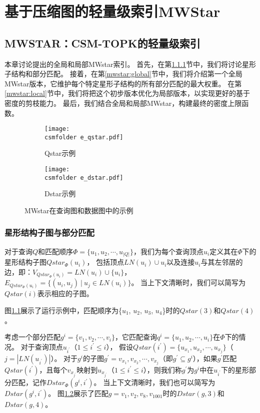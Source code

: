 \chapter{基于压缩图的轻量级索引MWStar}
\label{ch4}
\section{MWSTAR：CSM-TOPK的轻量级索引}
本章讨论提出的全局和局部MWstar索引。
首先，在第\ref{mwstar:star_subquery}节中，我们将讨论星形子结构和部分匹配。
接着，在第\ref{mwstar:global}节中，我们将介绍第一个全局MWstar版本，它维护每个特定星形子结构的所有部分匹配的最大权重。
在第\ref{mwstar:local}节中，我们将把这个初步版本优化为局部版本，以实现更好的基于密度的剪枝能力。
最后，我们结合全局和局部MWstar，构建最终的密度上限函数。

\begin{figure}[h!]
\def\wscorevone{0.48}
\centering
\begin{subfigure}[t]{\wscorevone\linewidth}
\centering
\resizebox{\linewidth}{!}
{
\texttt{[image: \\csmfolder e\_qstar.pdf]}
}
\caption{Qstar示例}
\label{fig:qstar}
\end{subfigure}
\begin{subfigure}[t]{\wscorevone\linewidth}
\centering
\resizebox{\linewidth}{!}
{
\texttt{[image: \\csmfolder e\_dstar.pdf]}
}
\caption{Dstar示例}
\label{fig:dstar}
\end{subfigure}
\caption{MWstar在查询图和数据图中的示例}
\label{fig:exp:mwstar}
\end{figure}

\subsection{星形结构子图与部分匹配}
\label{mwstar:star_subquery}

\begin{definition}[星形结构子图]\label{def:star-subquery}
对于查询$Q$和匹配顺序$\Phi=\{u_1, u_2, \cdots, u_{|Q|} \}$，我们为每个查询顶点$u_i$定义其在$\Phi$下的星形结构子图$Qstar_{\Phi}(u_i)$，
包括顶点$LN(u_i) \cup {u_i}$以及连接$u_i$与其左邻居的边，即：$V_{Qstar_{\Phi}(u_i)} = LN(u_i) \cup \{u_i\}$，$E_{Qstar_{\Phi}(u_i)} = \{(u_i, u_j)\ |\ u_j\in LN(u_i)\}$。
当上下文清晰时，我们可以简写为$Qstar(i)$表示相应的子图。
\end{definition}

图\ref{fig:qstar}展示了运行示例中，匹配顺序为\{$u_1$, $u_2$, $u_3$, $u_4$\}时的$Qstar(3)$和$Qstar(4)$。

考虑一个部分匹配$g^i=\{v_1, v_2, \cdots, v_i\}$，它匹配查询$q^i=\{u_1, u_2, \cdots, u_{i}\}$在$\Phi$下的情况。
对于查询顶点$u_{i^\prime}$（$1 \leq i^\prime \leq i$），
假设$Qstar(i^\prime) = \{u_{x_1}, u_{x_2}, \cdots, u_{x_j}\}$（$j = |LN(u_{i^\prime})|$）。
对于$g^i$的子图$g^\prime = {v_{x_1}, v_{x_2}, \cdots, v_{x_j}}$（即$g^\prime \subseteq g^i$），如果$g^\prime$匹配$Qstar(i^\prime)$，且每个$v_{x_{j^\prime}}$映射到$u_{x_{j^\prime}}$（$1 \leq i^\prime \leq i$），则我们称$g^\prime$为$g^i$中在$u_{i^\prime}$下的星形部分匹配，记作$Dstar_{\Phi}(g^i, i^\prime)$。
当上下文清晰时，我们也可以简写为$Dstar(g^i, i^\prime)$。
图\ref{fig:dstar}展示了匹配$g={v_1, v_2, v_8, v_{1001}}$时的$Dstar(g, 3)$和$Dstar(g, 4)$。

